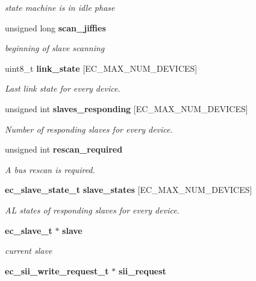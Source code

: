\begin{DoxyCompactItemize}
\begin{DoxyCompactList}\small\item\em state machine is in idle phase \end{DoxyCompactList}\item 
unsigned long {\bf scan\-\_\-jiffies}\label{structec__fsm__master_acf6f1bd6e82f2947e181ed23f9d5f6f9}

\begin{DoxyCompactList}\small\item\em beginning of slave scanning \end{DoxyCompactList}\item 
uint8\-\_\-t {\bf link\-\_\-state} [E\-C\-\_\-\-M\-A\-X\-\_\-\-N\-U\-M\-\_\-\-D\-E\-V\-I\-C\-E\-S]
\begin{DoxyCompactList}\small\item\em Last link state for every device. \end{DoxyCompactList}\item 
unsigned int {\bf slaves\-\_\-responding} [E\-C\-\_\-\-M\-A\-X\-\_\-\-N\-U\-M\-\_\-\-D\-E\-V\-I\-C\-E\-S]
\begin{DoxyCompactList}\small\item\em Number of responding slaves for every device. \end{DoxyCompactList}\item 
unsigned int {\bf rescan\-\_\-required}
\begin{DoxyCompactList}\small\item\em A bus rescan is required. \end{DoxyCompactList}\item 
{\bf ec\-\_\-slave\-\_\-state\-\_\-t} {\bf slave\-\_\-states} [E\-C\-\_\-\-M\-A\-X\-\_\-\-N\-U\-M\-\_\-\-D\-E\-V\-I\-C\-E\-S]
\begin{DoxyCompactList}\small\item\em A\-L states of responding slaves for every device. \end{DoxyCompactList}\item 
{\bf ec\-\_\-slave\-\_\-t} $\ast$ {\bf slave}\label{structec__fsm__master_aaa3d10bbf5af6278cec37fcd7b771372}

\begin{DoxyCompactList}\small\item\em current slave \end{DoxyCompactList}\item 
{\bf ec\-\_\-sii\-\_\-write\-\_\-request\-\_\-t} $\ast$ {\bf sii\-\_\-request}\label{structec__fsm__master_a0e8413b9433f4223911da952e2e26a7a}


\end{DoxyCompactItemize}
